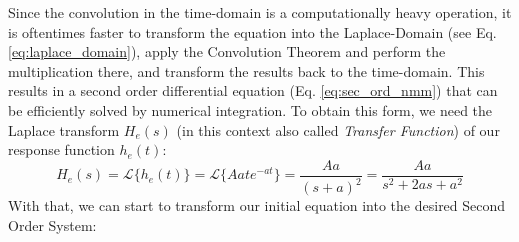 Since the convolution in the time-domain is a computationally heavy operation, it is oftentimes faster to transform the equation into the Laplace-Domain (see Eq. \ref{eq:laplace_domain}), apply the Convolution Theorem and perform the multiplication there, and transform the results back to the time-domain. This results in a second order differential equation (Eq. \ref{eq:sec_ord_nmm}) that can be efficiently solved by numerical integration. To obtain this form, we need the Laplace transform $H_e(s)$ (in this context also called \textit{Transfer Function}) of our response function $h_e(t)$:
\[H_e(s) =\mathscr{L}\{h_e(t)\}  = \mathscr{L}\{Aate^{-at} \} = \frac{Aa}{(s+a)^2} = \frac{Aa}{s^2+2as+a^2}\label{eq:laplace_h_e}\]
%
%
%
With that, we can start to transform our initial equation into the desired Second Order System:
